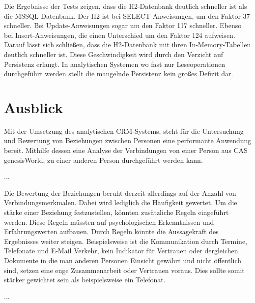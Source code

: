 Die Ergebnisse der Tests zeigen, dass die H2-Datenbank deutlich schneller ist als die MSSQL Datenbank. Der H2 ist bei SELECT-Anweisungen, um den Faktor 37 schneller. Bei Update-Anweisungen sogar um den Faktor 117 schneller. Ebenso bei Insert-Anweisungen, die einen Unterschied um den Faktor 124 aufweisen. Darauf lässt sich schließen, dass die H2-Datenbank mit ihren In-Memory-Tabellen deutlich schneller ist. Diese Geschwindigkeit wird durch den Verzicht auf Persistenz erlangt. In analytischen Systemen wo fast nur Leseoperationen durchgeführt werden stellt die mangelnde Persistenz kein großes Defizit dar. 

\section{Ausblick}
\label{ch:Ergebnis:sec:Ausblick}

Mit der Umsetzung des analytischen CRM-Systems, steht für die Untersuchung und Bewertung von Beziehungen zwischen Personen eine performante Anwendung bereit. Mithilfe dessen eine Analyse der Verbindungen von einer Person aus CAS genesisWorld, zu einer anderen Person durchgeführt werden kann.  

...

Die Bewertung der Beziehungen beruht derzeit allerdings auf der Anzahl von Verbindungsmerkmalen. Dabei wird lediglich die Häufigkeit gewertet. Um die stärke einer Beziehung festzustellen, könnten zusätzliche Regeln eingeführt werden. Diese Regeln müssten auf psychologischen Erkenntnissen und Erfahrungswerten aufbauen. Durch Regeln könnte die Aussagekraft des Ergebnisses weiter steigen. Beispielsweise ist die Kommunikation durch Termine, Telefonate und E-Mail Verkehr, kein Indikator für Vertrauen oder dergleichen. Dokumente in die man anderen Personen Einsicht gewährt und nicht öffentlich sind, setzen eine enge Zusammenarbeit oder Vertrauen voraus. Dies sollte somit stärker gewichtet sein als beispielsweise ein Telefonat. 

...

